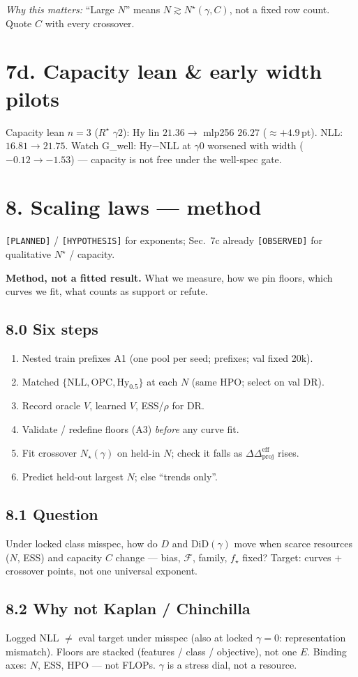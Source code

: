 \documentclass[11pt]{article}
\newcommand{\phonesection}[1]{\Needspace{8\baselineskip}\section*{#1}}
\newcommand{\phonesub}[1]{\Needspace{6\baselineskip}\subsection*{#1}}
\newcommand{\stag}[1]{\texttt{[#1]}}
\newcommand{\Rstar}{R^{\star}}
\newcommand{\DDprojeff}{\Delta\Delta_{\mathrm{proj}}^{\mathrm{eff}}}
\newcommand{\why}[1]{\par{\footnotesize\color{blue!35!black}\textit{Why this matters:} #1\par}}
\begin{document}
\why{``Large $N$'' means
$N\gtrsim N^{\star}(\gamma,C)$, not a fixed
row count. Quote $C$ with every crossover.}

\phonesection{7d. Capacity lean \& early
width pilots}

Capacity lean $n{=}3$ ($\Rstar$ $\gamma2$):
Hy lin $21.36\to$ mlp256 $26.27$
($\approx +4.9$\,pt). NLL: $16.81\to 21.75$.
Watch G\_well: Hy$-$NLL at $\gamma0$ worsened
with width ($-0.12\to -1.53$) --- capacity
is not free under the well-spec gate.

\phonesection{8. Scaling laws --- method}

\stag{PLANNED} / \stag{HYPOTHESIS} for
exponents; Sec.~7c already \stag{OBSERVED}
for qualitative $N^{\star}$ / capacity.

\textbf{Method, not a fitted result.}  What we
measure, how we pin floors, which curves we
fit, what counts as support or refute.

\phonesub{8.0 Six steps}
\begin{enumerate}
  \item Nested train prefixes A1 (one pool
        per seed; prefixes; val fixed 20k).
  \item Matched $\{\mathrm{NLL},\mathrm{OPC},
        \mathrm{Hy}_{0.5}\}$ at each $N$
        (same HPO; select on val DR).
  \item Record oracle $V$, learned $V$,
        ESS/$\rho$ for DR.
  \item Validate / redefine floors (A3)
        \emph{before} any curve fit.
  \item Fit crossover $N_{\star}(\gamma)$ on
        held-in $N$; check it falls as
        $\DDprojeff$ rises.
  \item Predict held-out largest $N$; else
        ``trends only''.
\end{enumerate}

\phonesub{8.1 Question}
Under locked class misspec, how do
$D$ and $\mathrm{DiD}(\gamma)$ move when
scarce resources ($N$, ESS) and capacity $C$
change --- bias, $\mathcal{F}$, family,
$f_{\star}$ fixed?  Target: curves $+$
crossover points, not one universal
exponent.

\phonesub{8.2 Why not Kaplan / Chinchilla}
Logged NLL $\ne$ eval target under misspec
(also at locked $\gamma{=}0$: representation
mismatch).  Floors are stacked (features /
class / objective), not one $E$.  Binding
axes: $N$, ESS, HPO --- not FLOPs.  $\gamma$
is a stress dial, not a resource.
\end{document}

